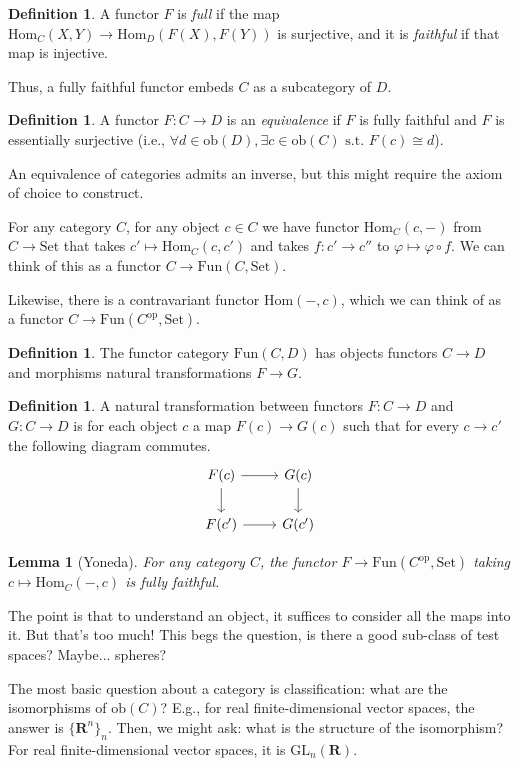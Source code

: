 \documentclass[10pt]{article}
\newtheorem{lemma}[theorem]{Lemma}
\theoremstyle{definition}
\newtheorem{definition}[theorem]{Definition}
\begin{document}
	\begin{definition}
		A functor $F$ is \emph{full} if the map $\text{Hom}_{C}(X,Y)\to\text{Hom}_{D}(F(X),F(Y))$ is surjective, and it is \emph{faithful} if that map is injective. 
	\end{definition}
	Thus, a fully faithful functor embeds $C$ as a subcategory of $D$. 
	\begin{definition}
		A functor $F:C\to D$ is an \emph{equivalence} if $F$ is fully faithful and $F$ is essentially surjective (i.e., $\forall d\in\text{ob}(D),\exists c\in\text{ob}(C)\text{ s.t. }F(c)\cong d$).
	\end{definition}
	An equivalence of categories admits an inverse, but this might require the axiom of choice to construct.  
	
	For any category $C$, for any object $c\in C$ we have functor $\text{Hom}_{C}(c,-)$ from $C\to\text{Set}$ that takes $c'\mapsto \text{Hom}_{C}(c,c')$ and takes $f:c'\to c''$ to $\varphi\mapsto \varphi\circ f$. We can think of this as a functor $C\to\text{Fun}(C,\text{Set})$. 
		
	Likewise, there is a contravariant functor $\text{Hom}(-,c)$, which we can think of as a functor $C\to\text{Fun}(C^{\text{op}},\text{Set})$.
	
	\begin{definition}
		The functor category $\text{Fun}(C,D)$ has objects functors $C\to D$ and morphisms natural transformations $F\to G$. 
	\end{definition} 
	\begin{definition}
		A natural transformation between functors $F:C\to D$ and $G:C\to D$ is for each object $c$ a map $F(c)\to G(c)$ such that for every  $c\to c'$ the following diagram commutes.
		$$\begin{tikzcd}
				F(c) \arrow[r] \arrow[d] & G(c) \arrow[d] \\
				F(c') \arrow[r]          & G(c')         
			\end{tikzcd}$$
	\end{definition}
	\begin{lemma}[Yoneda]
		For any category $C$, the functor $F\to\text{Fun}(C^{\text{op}},\text{Set})$ taking $c\mapsto\text{Hom}_{C}(-,c)$ is fully faithful. 
	\end{lemma}
	The point is that to understand an object, it suffices to consider all the maps into it. But that's too much! This begs the question, is there a good sub-class of test spaces? Maybe... spheres? 
	
	The most basic question about a category is classification: what are the isomorphisms of $\text{ob}(C)$? E.g., for real finite-dimensional vector spaces, the answer is $\{\mathbf{R}^{n}\}_{n}$. Then, we might ask: what is the structure of the isomorphism? For real finite-dimensional vector spaces, it is $\text{GL}_{n}(\mathbf{R})$.
	
\end{document}

